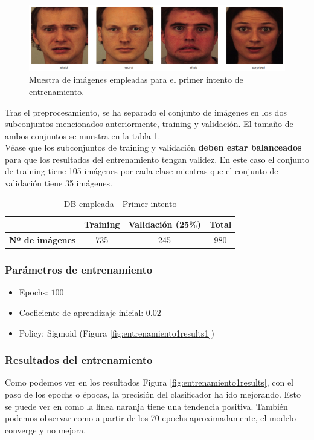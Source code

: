 \documentclass[a4paper,11pt]{book}
\begin{document}
\begin{figure}[h]
\centering
\includegraphics[width=0.7\linewidth]{imagenes/primerIntentoDB}
\caption[PrimerIntentoDB]{Muestra de imágenes empleadas para el primer intento de entrenamiento.}
\label{fig:primerIntentoDB}
\end{figure}

Tras el preprocesamiento, se ha separado el conjunto de imágenes en los dos subconjuntos mencionados anteriormente, training y validación. El tamaño de ambos conjuntos se muestra en la tabla \ref{entr:PrimerIntento-DB}.\\
Véase que los subconjuntos de training y validación \textbf{deben estar balanceados} para que los resultados del entrenamiento tengan validez. En este caso el conjunto de training tiene 105 imágenes por cada clase mientras que el conjunto de validación tiene 35 imágenes.

\begin{table}[h]
	\centering
	\begin{tabular}{c|c|c|c|}
		\cline{2-4}
		& \textbf{Training} & \textbf{Validación} (25\%) & \textbf{Total} \\ \hline
		\multicolumn{1}{|c|}{\textbf{Nº de imágenes}} & 735        & 245          & 980     \\ \hline
	\end{tabular}
	\caption{DB empleada - Primer intento}
	\label{entr:PrimerIntento-DB}
\end{table}

\subsubsection{Parámetros de entrenamiento}
\begin{itemize}
	\item Epochs: \(100\)
	\item Coeficiente de aprendizaje inicial: \(0.02\)
	\item Policy: Sigmoid (Figura \ref{fig:entrenamiento1results1})
\end{itemize}

\subsubsection{Resultados del entrenamiento}
Como podemos ver en los resultados Figura \ref{fig:entrenamiento1results}, con el paso de los epochs o épocas, la precisión del clasificador ha ido mejorando. Esto se puede ver en como la línea naranja tiene una tendencia positiva. También podemos observar como a partir de los 70 epochs aproximadamente, el modelo converge y no mejora.\\
\end{document}
